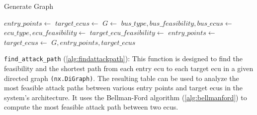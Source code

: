 \begin{algorithm}[h]
    \caption{Generate Graph}
    \label{alg:generate_graph}
    \begin{algorithmic}[1]
        \State $entry\_points \gets$ 
        \State $target\_ecus \gets$ 
        \State $G \gets$ 
            \State $bus\_type, bus\_feasibility, bus\_ecus \gets$ 
                \State $ecu\_type, ecu\_feasibility \gets$ 
                    \State {}
                \EndIf
                    \State {}
                \EndIf
                        \State {}
                    \Else
                        \State $target\_ecu\_feasibility \gets$ 
                        \State {}
                    \EndIf
                \EndFor
            \EndFor
        \EndFor
        \State $entry\_points \gets$ 
        \State $target\_ecus \gets$ 
        \State \Return $G, entry\_points, target\_ecus$
    \EndProcedure
    \end{algorithmic}
\end{algorithm}

\newpage

\texttt{find\_attack\_path} (\ref{alg:findattackpath}): 
This function is designed to find the feasibility and the shortest path from each entry \acrshort{ecu} 
to each target \acrshort{ecu} in a given directed graph \texttt{(nx.DiGraph)}.
The resulting table can be used to analyze the most feasible attack paths between 
various entry points and target \acrshort{ecu}s in the system's architecture.
It uses the Bellman-Ford algorithm (\ref{alg:bellmanford}) to compute the most feasible attack path between two \acrshort{ecu}s.\\

